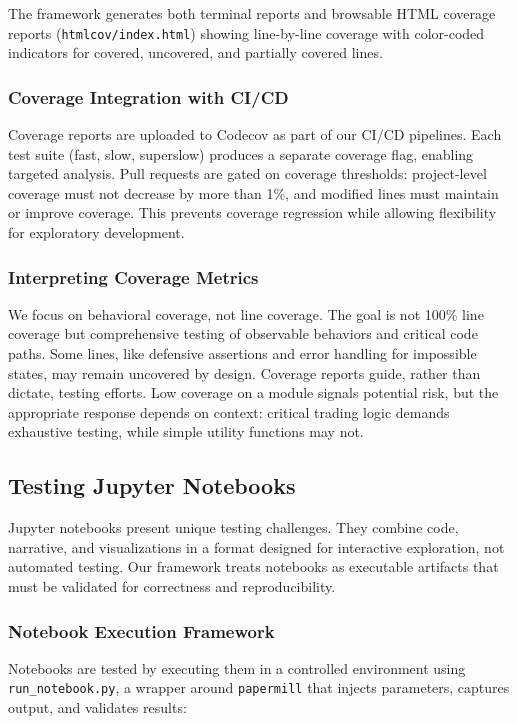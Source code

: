 The framework generates both terminal reports and browsable HTML
coverage reports (\texttt{htmlcov/index.html}) showing line-by-line coverage
with color-coded indicators for covered, uncovered, and partially covered
lines.

\subsubsection{Coverage Integration with CI/CD}
Coverage reports are uploaded to Codecov as part of our CI/CD pipelines.
Each test suite (fast, slow, superslow) produces a separate coverage flag,
enabling targeted analysis. Pull requests are gated on coverage thresholds:
project-level coverage must not decrease by more than 1\%, and modified
lines must maintain or improve coverage. This prevents coverage regression
while allowing flexibility for exploratory development.

\subsubsection{Interpreting Coverage Metrics}
We focus on behavioral coverage, not line coverage. The goal is not 100\%
line coverage but comprehensive testing of observable behaviors and critical
code paths. Some lines, like defensive assertions and error handling for
impossible states, may remain uncovered by design. Coverage reports guide,
rather than dictate, testing efforts. Low coverage on a module signals
potential risk, but the appropriate response depends on context:
critical trading logic demands exhaustive testing, while simple utility functions
may not.

\subsection{Testing Jupyter Notebooks}
Jupyter notebooks present unique testing challenges. They combine code,
narrative, and visualizations in a format designed for interactive exploration,
not automated testing. Our framework treats notebooks as executable artifacts
that must be validated for correctness and reproducibility.

\subsubsection{Notebook Execution Framework}
Notebooks are tested by executing them in a controlled environment using
\texttt{run\_notebook.py}, a wrapper around \texttt{papermill} that injects
parameters, captures output, and validates results:

